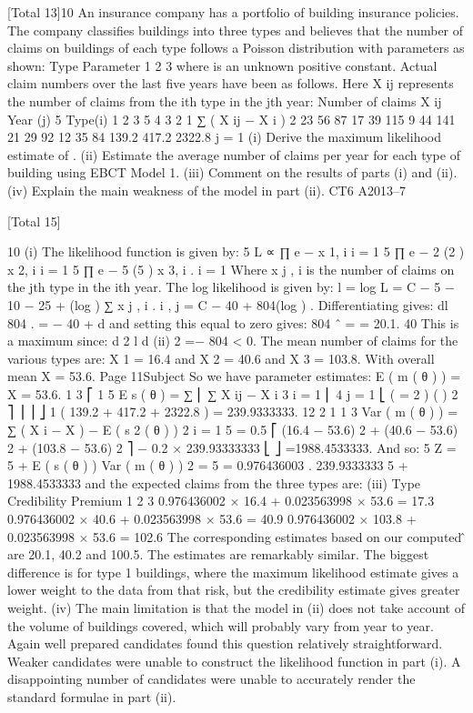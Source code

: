[Total 13]10
An insurance company has a portfolio of building insurance policies. The company
classifies buildings into three types and believes that the number of claims on
buildings of each type follows a Poisson distribution with parameters as shown:
Type Parameter
1
2
3  \lambda
where \lambda is an unknown positive constant.
Actual claim numbers over the last five years have been as follows. Here X ij
represents the number of claims from the ith type in the jth year:
Number of claims X ij
Year (j)
5
Type(i)
1
2
3
5 4 3 2 1 ∑ ( X ij − X i ) 2
23
56
87 17
39
115 9
44
141 21
29
92 12
35
84 139.2
417.2
2322.8
j = 1
(i) Derive the maximum likelihood estimate of \lambda . 
(ii) Estimate the average number of claims per year for each type of building
using EBCT Model 1. 
(iii) Comment on the results of parts (i) and (ii). 
(iv) Explain the main weakness of the model in part (ii).
CT6 A2013–7

[Total 15]



10
(i)
The likelihood function is given by:
5
L ∝ ∏ e −\lambda \lambda
x 1, i
i = 1
5
∏ e − 2 \lambda (2 \lambda )
x 2, i
i = 1
5
∏ e − 5 \lambda (5 \lambda )
x 3, i
.
i = 1
Where x j , i is the number of claims on the jth type in the ith year.
The log likelihood is given by:
l = log L = C − 5 \lambda − 10 \lambda − 25 \lambda + (log \lambda ) ∑ x j , i .
i , j
= C − 40 \lambda + 804(log \lambda ) .
Differentiating gives:
dl
804
.
= − 40 +
d \lambda
\lambda
and setting this equal to zero gives:
804
\lambda ˆ =
= 20.1.
40
This is a maximum since:
d 2 l
d \lambda
(ii)
2
=−
804
< 0.
The mean number of claims for the various types are:
X 1 = 16.4 and X 2 = 40.6 and X 3 = 103.8.
With overall mean X = 53.6.
Page 11Subject %
So we have parameter estimates:
E ( m ( θ ) ) = X = 53.6.
1 3 ⎡ 1 5
E s ( θ ) = ∑ ⎢ ∑ X ij − X i
3 i = 1 ⎢ 4 j = 1
⎣
(
=
2
)
(
)
2 ⎤
⎥
⎥ ⎦
1
( 139.2 + 417.2 + 2322.8 ) = 239.9333333.
12
2 1
1 3
Var ( m ( θ ) ) = ∑ ( X i − X ) − E ( s 2 ( θ ) )
2 i = 1
5
= 0.5 ⎡ (16.4 − 53.6) 2 + (40.6 − 53.6) 2 + (103.8 − 53.6) 2 ⎤ − 0.2 × 239.93333333
⎣
⎦
=1988.4533333.
And so:
5
Z =
5 +
E ( s ( θ ) )
Var ( m ( θ ) )
2
=
5
= 0.976436003 .
239.9333333
5 +
1988.4533333
and the expected claims from the three types are:
(iii)
Type Credibility Premium
1
2
3 0.976436002 × 16.4 + 0.023563998 × 53.6 = 17.3
0.976436002 × 40.6 + 0.023563998 × 53.6 = 40.9
0.976436002 × 103.8 + 0.023563998 × 53.6 = 102.6
The corresponding estimates based on our computed \lambdâ are 20.1, 40.2 and
100.5.
The estimates are remarkably similar. The biggest difference is for type 1
buildings, where the maximum likelihood estimate gives a lower weight to the
data from that risk, but the credibility estimate gives greater weight.
(iv)
The main limitation is that the model in (ii) does not take account of the
volume of buildings covered, which will probably vary from year to year.
Again well prepared candidates found this question relatively straightforward. Weaker
candidates were unable to construct the likelihood function in part (i). A disappointing
number of candidates were unable to accurately render the standard formulae in part (ii).
